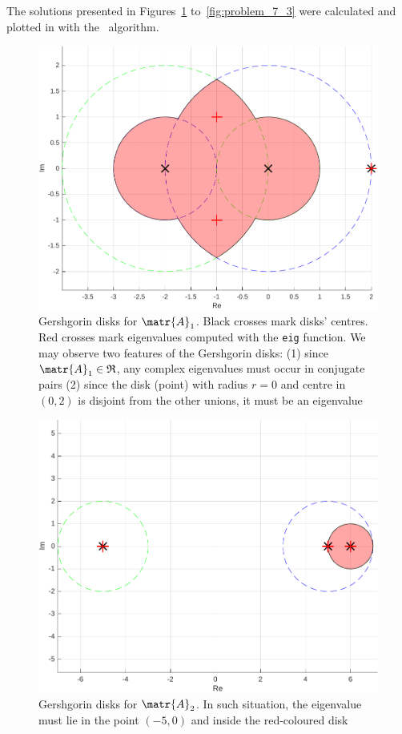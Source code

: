 The solutions presented in Figures~\ref{fig:problem_7_1} to~\ref{fig:problem_7_3} were calculated and plotted in \MATLAB{} with the~ algorithm.

\begin{figure}
    \includegraphics[width=\textwidth]{problems/problem_7_1.pdf}
    \caption{Gershgorin disks for $\matr{A}_1$. Black crosses mark disks' centres. Red crosses mark eigenvalues computed with the \MATLAB \texttt{eig} function. We may observe two features of the Gershgorin disks: (1) since $\matr{A}_1\in\mathfrak{R}$, any complex eigenvalues must occur in conjugate pairs (2) since the disk (point) with radius $r=0$ and centre in $(0,2)$ is disjoint from the other unions, it must be an eigenvalue}
    \label{fig:problem_7_1}
\end{figure}

\begin{figure}
    \includegraphics[width=\textwidth]{problems/problem_7_2.pdf}
    \caption{Gershgorin disks for $\matr{A}_2$. In such situation, the eigenvalue must lie in the point $(-5,0)$ and inside the red-coloured disk}
    \label{fig:problem_7_2}
\end{figure}

